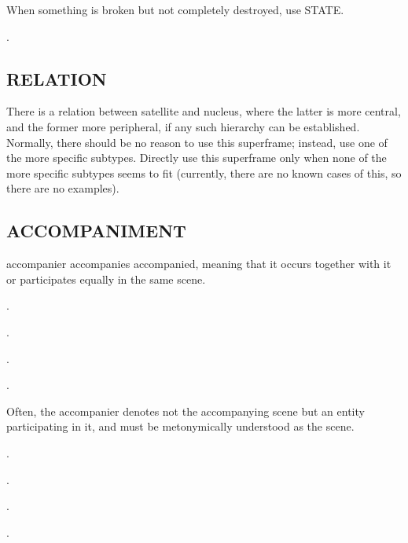 \documentclass[a4paper]{article}
\newcommand{\fr}[1]{\textsf{#1}}
\newcommand{\rl}[1]{\textsf{#1}}
\begin{document}
When something is broken but not completely destroyed, use \fr{STATE}.

\ex.

\newpage\subsection{ \fr{RELATION}}
\label{sec:RELATION}

There is a relation between \rl{satellite} and \rl{nucleus}, where the latter
is more central, and the former more peripheral, if any such hierarchy can be
established.  Normally, there should be no reason to use this superframe;
instead, use one of the more specific subtypes.  Directly use this superframe
only when none of the more specific subtypes seems to fit (currently, there are
no known cases of this, so there are no examples).

\newpage\subsection{ \fr{ACCOMPANIMENT}}
\label{sec:ACCOMPANIMENT}

\rl{accompanier} accompanies \rl{accompanied}, meaning that it occurs together
with it or participates equally in the same scene.

\ex.

\ex.

\ex.

\ex.

Often, the accompanier denotes not the accompanying scene but an entity
participating in it, and must be metonymically understood as the scene.

\ex.

\ex.

\ex.

\ex.
\end{document}
